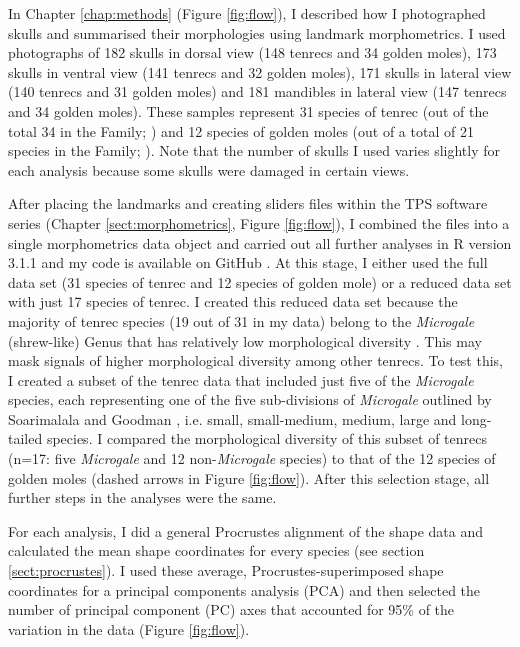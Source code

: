 	In Chapter \ref{chap:methods} (Figure \ref{fig:flow}), I described how I photographed skulls and summarised their morphologies using landmark morphometrics. I used photographs of 182 skulls in dorsal view (148 tenrecs and 34 golden moles), 173 skulls in ventral view (141 tenrecs and 32 golden moles), 171 skulls in lateral view (140 tenrecs and 31 golden moles) and 181 mandibles in lateral view (147 tenrecs and 34 golden moles). These samples represent 31 species of tenrec (out of the total 34 in the Family; \citealp{Olson2013}) and 12 species of golden moles (out of a total of 21 species in the Family; \citealp{Asher2010}). Note that the number of skulls I used varies slightly for each analysis because some skulls were damaged in certain views.
	

	After placing the landmarks and creating sliders files within the TPS software series (Chapter \ref{sect:morphometrics}, Figure \ref{fig:flow}), I combined the files into a single morphometrics data object and carried out all further analyses in R version 3.1.1 \citep{Team2014} and my code is available on GitHub \citep{Finlay2015c}. At this stage, I either used the full data set (31 species of tenrec and 12 species of golden mole) or a reduced data set with just 17 species of tenrec. I created this reduced data set because the majority of tenrec species (19 out of 31 in my data) belong to the \textit{Microgale} (shrew-like) Genus that has relatively low morphological diversity \citep{Soarimalala2011, Jenkins2003}. This may mask signals of higher morphological diversity among other tenrecs. To test this, I created a subset of the tenrec data that included just five of the \textit{Microgale} species, each representing one of the five sub-divisions of \textit{Microgale} outlined by Soarimalala and Goodman \citeyearpar{Soarimalala2011}, i.e. small, small-medium, medium, large and long-tailed species. I compared the morphological diversity of this subset of tenrecs (n=17: five \textit{Microgale} and 12 non-\textit{Microgale} species) to that of the 12 species of golden moles (dashed arrows in Figure \ref{fig:flow}). After this selection stage, all further steps in the analyses were the same.
		
	For each analysis, I did a general Procrustes alignment of the shape data and calculated the mean shape coordinates for every species (see section \ref{sect:procrustes}). I used these average, Procrustes-superimposed shape coordinates for a principal components analysis (PCA) and then selected the number of principal component (PC) axes that accounted for 95\% of the variation in the data (Figure \ref{fig:flow}).
	
